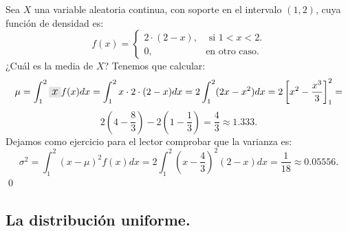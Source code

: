 \begin{ejemplo}
\label{cap05:ejem:MediaVarianzaVariableAleatoriaContinua}
    Sea $X$ una variable aleatoria continua, con soporte en el intervalo $(1,2)$, cuya función de densidad es:
    \[
    f(x)=\begin{cases}2\cdot(2-x),&\mbox{ si }1<x<2.\\0,&\mbox{en otro caso.}\end{cases}
    \]
    ¿Cuál es la media de $X$? Tenemos que calcular:
    \[
    \mu=\int_{1}^{2}\colorbox{lightgrey}{\large$x$}f(x)dx=\int_{1}^{2}x\cdot 2\cdot(2-x)dx=2\int_{1}^{2}(2x-x^2)dx=2\left[x^2-\frac{x^3}{3}\right]_1^2=\]
    \[2\left(4-\frac{8}{3}\right)-2\left(1-\frac{1}{3}\right)=\dfrac{4}{3}\approx 1.333. \]
    Dejamos como ejercicio para el lector comprobar que la varianza es:
    \[
    \sigma^2=\int_{1}^{2}(x-\mu)^2f(x)dx=2\int_{1}^{2}\left(x-\dfrac{4}{3}\right)^2(2-x)dx=\dfrac{1}{18}\approx 0.05556.
    \]
    \qed
\end{ejemplo}

\subsection{La distribución uniforme.}
\label{cap05:subsec:DistribucionUniforme}

